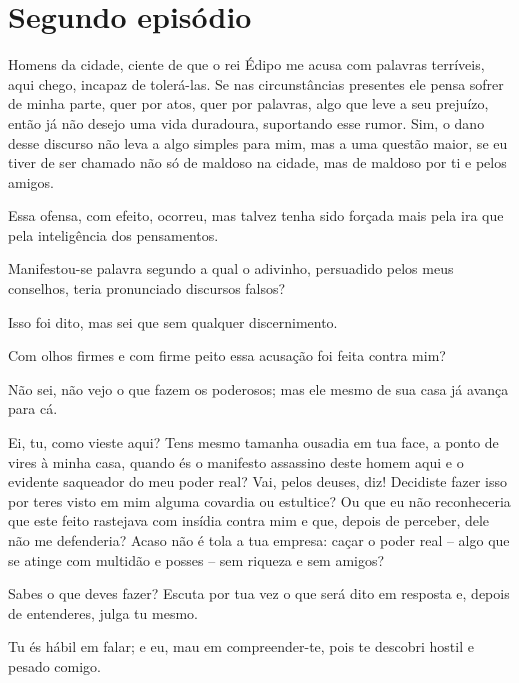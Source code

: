 \section{Segundo episódio}



   Homens da cidade, ciente de que o rei Édipo me acusa com palavras
terríveis, aqui chego, incapaz de tolerá-las. Se nas circunstâncias
presentes ele pensa sofrer de minha parte, quer por atos, quer por
palavras, algo que leve a seu prejuízo, então já não desejo uma
vida duradoura, suportando esse rumor. Sim, o dano desse discurso não
leva a algo simples para mim, mas a uma questão maior, se eu tiver de
ser chamado não só de maldoso na cidade, mas de maldoso por ti e pelos
amigos.

   Essa ofensa, com efeito, ocorreu, mas talvez tenha sido forçada mais
pela ira que pela inteligência dos pensamentos.

   Manifestou-se palavra segundo a qual o adivinho, persuadido pelos meus
conselhos, teria pronunciado discursos falsos?

   Isso foi dito, mas sei que sem qualquer discernimento.

   Com olhos firmes e com firme peito essa acusação foi feita contra mim?

    Não sei, não vejo o que fazem os poderosos; mas ele mesmo de sua
casa já avança para cá.


   Ei, tu, como vieste aqui? Tens mesmo tamanha ousadia em tua face, a
ponto de vires à minha casa, quando és o manifesto assassino deste homem
aqui e o evidente saqueador do meu poder real? Vai, pelos deuses, diz!
Decidiste fazer isso por teres visto em mim alguma covardia ou
estultice? Ou que eu não reconheceria que este feito rastejava com
insídia contra mim e que, depois de perceber, dele não me defenderia?
 Acaso não é tola a tua empresa: caçar o poder real -- algo que se
atinge com multidão e posses -- sem riqueza e sem amigos?

   Sabes o que deves fazer? Escuta por tua vez o que será dito em resposta
e, depois de entenderes, julga tu mesmo.

   Tu és hábil em falar; e eu, mau em compreender-te, pois te descobri
hostil e pesado comigo.

